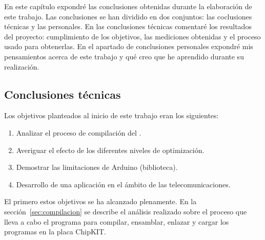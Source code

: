 En este capítulo expondré las conclusiones obtenidas durante la elaboración de este trabajo. Las conclusiones se han dividido en dos conjuntos: las coclusiones técnicas y las personales. En las  conclusiones técnicas comentaré los resultados del proyecto: cumplimiento de los objetivos, las mediciones obtenidas y el proceso usado para obtenerlas. En el apartado de conclusiones personales expondré mis pensamientos acerca de este trabajo y qué creo que he aprendido durante su realización.

\subsection{Conclusiones técnicas}

%
% 

Los objetivos planteados al inicio de este trabajo eran los siguientes:

\begin{enumerate}
    \item Analizar el proceso de compilación del .
    \item Averiguar el efecto de los diferentes niveles de optimización.
    \item Demostrar las limitaciones de Arduino (biblioteca).
    \item Desarrollo de una aplicación en el ámbito de las telecomunicaciones.
\end{enumerate}


El primero estos objetivos se ha alcanzado plenamente. En la sección~\ref{sec:compilacion} se describe el análisis realizado sobre el proceso que lleva a cabo el programa  para compilar, ensamblar, enlazar y cargar los programas en la placa ChipKIT\@.

